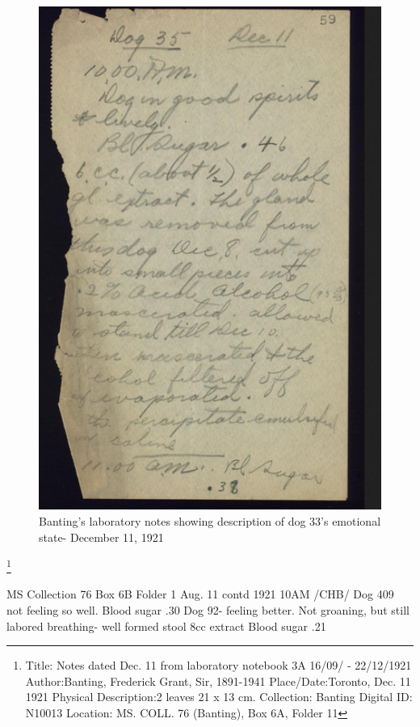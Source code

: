 \documentclass[12pt]{article}
\begin{document}
\begin{figure}[H]
\centering
 \includegraphics [width=5.5in]{Dog_lab}
  \caption{Banting's laboratory notes showing description of dog 33's emotional state- December 11, 1921}
  \label{fig:Dog 33 Laboratory Note}
\end{figure}
\footnote{Title: Notes dated Dec. 11 from laboratory notebook 3A 16/09/ - 22/12/1921
Author:Banting, Frederick Grant, Sir, 1891-1941
Place/Date:Toronto, Dec. 11 1921
Physical Description:2 leaves 21 x 13 cm.
Collection: Banting
Digital ID: N10013
Location: MS. COLL. 76 (Banting), Box 6A, Folder 11}


MS Collection 76
Box 6B 
Folder 1
Aug. 11 contd 1921
10AM /CHB/
Dog 409 not feeling so well. Blood sugar .30
Dog 92- feeling better. Not groaning, but still labored breathing- well formed stool
8cc extract
Blood sugar .21
\end{document}

